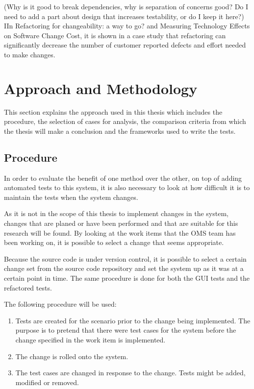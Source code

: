 \documentclass{article}
\begin{document}
		(Why is it good to break dependencies, why is separation of concerns good? Do I need to add a part about design that increases testability, or do I keep it here?)
		IIn Refactoring for changeability: a way to go? and Measuring Technology Effects on Software Change Cost, it is shown in a case study that refactoring can significantly decrease the number of customer reported defects and effort needed to make changes.


	\section{Approach and Methodology}
		This section explains the approach used in this thesis which includes the procedure, the selection of cases for analysis, the comparison criteria from which the thesis will make a conclusion and the frameworks used to write the tests.

		\subsection{Procedure}
		In order to evaluate the benefit of one method over the other, on top of adding automated tests to this system, it is also necessary to look at how difficult it is to maintain the tests when the system changes. 

		As it is not in the scope of this thesis to implement changes in the system, changes that are planed or have been performed and that are suitable for this research will be found. By looking at the work items that the OMS team has been working on, it is possible to select a change that seems appropriate. 

		Because the source code is under version control, it is possible to select a certain change set from the source code repository and set the system up as it was at a certain point in time.
		The same procedure is done for both the GUI tests and the refactored tests.

		The following procedure will be used:

		\begin{enumerate}
			\item  Tests are created for the scenario prior to the change being implemented. The purpose is to pretend that there were test cases for the system before the change specified in the work item is implemented.
			\item The change is rolled onto the system.
			\item The test cases are changed in response to the change. Tests might be added, modified or removed.
		\end{enumerate}
\end{document}
